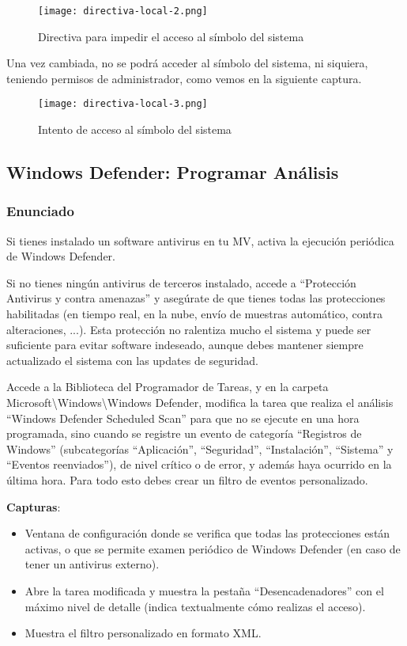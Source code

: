 \begin{enumerate}
    \begin{figure}[H]
        \centering
        \texttt{[image: directiva-local-2.png]}
        \caption{Directiva para impedir el acceso al símbolo del sistema}
    \end{figure}

    Una vez cambiada, no se podrá acceder al símbolo del sistema, ni siquiera, teniendo permisos de administrador, como vemos en la siguiente captura.

    \begin{figure}[H]
        \centering
        \texttt{[image: directiva-local-3.png]}
        \caption{Intento de acceso al símbolo del sistema}
    \end{figure}
\end{enumerate}

\subsection{Windows Defender: Programar Análisis}
\subsubsection{Enunciado}
Si tienes instalado un software antivirus en tu MV, activa la ejecución periódica de Windows Defender.

Si no tienes ningún antivirus de terceros instalado, accede a ``Protección Antivirus y contra amenazas'' y asegúrate de que tienes todas las protecciones habilitadas (en tiempo real, en la nube, envío de muestras automático, contra alteraciones, ...). Esta protección no ralentiza mucho el sistema y puede ser suficiente para evitar software indeseado, aunque debes mantener siempre actualizado el sistema con las updates de seguridad.

Accede a la Biblioteca del Programador de Tareas, y en la carpeta Microsoft\textbackslash Windows\textbackslash Windows Defender, modifica la tarea que realiza el análisis ``Windows Defender Scheduled Scan'' para que no se ejecute en una hora programada, sino cuando se registre un evento de categoría ``Registros de Windows'' (subcategorías ``Aplicación'', ``Seguridad'', ``Instalación'', ``Sistema'' y ``Eventos reenviados''), de nivel crítico o de error, y además haya ocurrido en la última hora. Para todo esto debes crear un filtro de eventos personalizado.

\textbf{Capturas}:

\begin{itemize}
    \item Ventana de configuración donde se verifica que todas las protecciones están activas, o que se permite examen periódico de Windows Defender (en caso de tener un antivirus externo).
    \item Abre la tarea modificada y muestra la pestaña ``Desencadenadores'' con el máximo nivel de detalle (indica textualmente cómo realizas el acceso).
    \item Muestra el filtro personalizado en formato XML.
\end{itemize}


